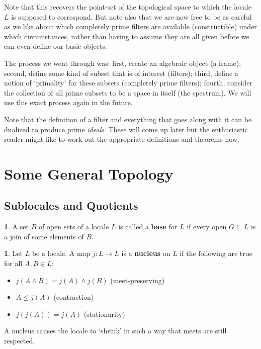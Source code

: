 \documentclass[oneside,english]{amsbook}
\numberwithin{section}{chapter}
\theoremstyle{plain}
\theoremstyle{definition}
\newtheorem{defn}[thm]{\protect\definitionname}
\providecommand{\definitionname}{Definition}
\begin{document}
Note that this recovers the point-set of the topological space to which the locale $L$ is supposed to correspond. But note also that we are now free to be as careful as we like about which completely prime filters are available (constructible) under which circumstances, rather than having to assume they are all given before we can even define our basic objects.

The process we went through was: first, create an algebraic object (a frame); second, define some kind of subset that is of interest (filters); third, define a notion of `primality' for these subsets (completely prime filters); fourth, consider the collection of all prime subsets to be a space in itself (the spectrum). We will use this exact process again in the future.

Note that the definition of a filter and everything that goes along with it can be dualized to produce prime \emph{ideals}. These will come up later but the enthusiastic reader might like to work out the appropriate definitions and theorems now.

\section{Some General Topology}

\subsection{Sublocales and Quotients}

\begin{defn}
	A set $B$ of open sets of a locale $L$ is called a \textbf{base} for $L$ if every open $G\subseteq L$ is a join of some elements of $B$.
\end{defn}

\begin{defn}
	Let $L$ be a locale. A map $j:L\to L$ is a \textbf{nucleus} on $L$ if the following are true for all $A, B\in L$:
	\begin{itemize}
		\item {$j(A\land B) = j(A)\land j(B)$ (meet-preserving)}
		\item {$A\le j(A)$ (contraction)}
		\item{$j(j(A))= j(A)$ (stationarity)}
	\end{itemize}
\end{defn}

A nucleus causes the locale to `shrink' in such a way that meets are still respected. 
\end{document}
